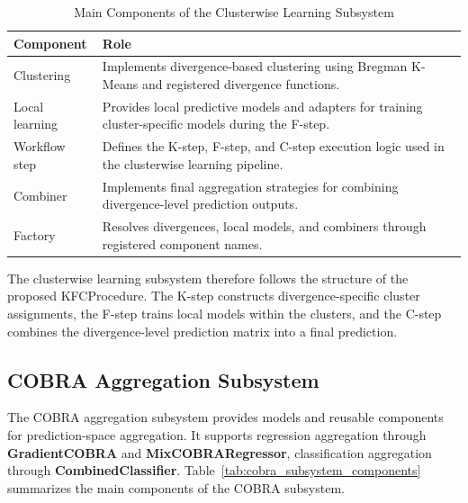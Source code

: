 \begin{table}[H]
      \centering
      \caption{Main Components of the Clusterwise Learning Subsystem}
      \label{tab:kfc_core_components}
      \renewcommand{\arraystretch}{1.2}
      \begin{tabularx}{\textwidth}{
                  >{\raggedright\arraybackslash}p{3.5cm}
                  >{\raggedright\arraybackslash}X
            }
            \toprule
            \textbf{Component} & \textbf{Role}                                                                    \\
            \midrule
            Clustering         &
            Implements divergence-based clustering using Bregman K-Means and registered divergence functions.     \\

            Local learning     &
            Provides local predictive models and adapters for training cluster-specific models during the F-step. \\

            Workflow step      &
            Defines the K-step, F-step, and C-step execution logic used in the clusterwise learning pipeline.     \\

            Combiner           &
            Implements final aggregation strategies for combining divergence-level prediction outputs.            \\

            Factory            &
            Resolves divergences, local models, and combiners through registered component names.                 \\
            \bottomrule
      \end{tabularx}

\end{table}

The clusterwise learning subsystem therefore follows the structure of the proposed KFCProcedure. The K-step constructs divergence-specific cluster assignments, the F-step trains local models within the clusters, and the C-step combines the divergence-level prediction matrix into a final prediction.

\subsection{COBRA Aggregation Subsystem}

\hs The COBRA aggregation subsystem provides models and reusable components for prediction-space aggregation. It supports regression aggregation through \textbf{GradientCOBRA} and \textbf{MixCOBRARegressor}, classification aggregation through \textbf{CombinedClassifier}. Table~\ref{tab:cobra_subsystem_components} summarizes the main components of the COBRA subsystem.

